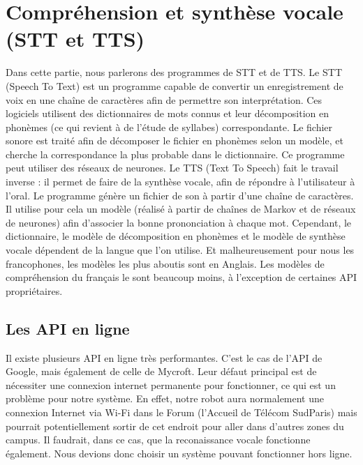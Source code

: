 \documentclass[a4paper,10pt]{report}
\begin{document}
    \section{Compréhension et synthèse vocale (STT et TTS)}
    {Dans cette partie, nous parlerons des programmes de STT et de TTS.}
    {Le STT (Speech To Text) est un programme capable de convertir un enregistrement de voix en une chaîne de caractères afin de permettre son interprétation. Ces logiciels utilisent des dictionnaires de mots connus et leur décomposition en phonèmes (ce qui revient à de l'étude de syllabes) correspondante. Le fichier sonore est traité afin de décomposer le fichier en phonèmes selon un modèle, et cherche la correspondance la plus probable dans le dictionnaire. Ce programme peut utiliser des réseaux de neurones.}
    {Le TTS (Text To Speech) fait le travail inverse : il permet de faire de la synthèse vocale, afin de répondre à l'utilisateur à l'oral. Le programme génère un fichier de son à partir d'une chaîne de caractères. Il utilise pour cela un modèle (réalisé à partir de chaînes de Markov et de réseaux de neurones) afin d'associer la bonne prononciation à chaque mot.}
    {\newline Cependant, le dictionnaire, le modèle de décomposition en phonèmes et le modèle de synthèse vocale dépendent de la langue que l'on utilise. Et malheureusement pour nous les francophones, les modèles les plus aboutis sont en Anglais. Les modèles de compréhension du français le sont beaucoup moins, à l'exception de certaines API propriétaires.}
      \subsection{Les API en ligne}
      {Il existe plusieurs API en ligne très performantes. C'est le cas de l'API de Google, mais également de celle de Mycroft. Leur défaut principal est de nécessiter une connexion internet permanente pour fonctionner, ce qui est un problème pour notre système. En effet, notre robot aura normalement une connexion Internet via Wi-Fi dans le Forum (l'Accueil de Télécom SudParis) mais pourrait potentiellement sortir de cet endroit pour aller dans d'autres zones du campus. Il faudrait, dans ce cas, que la reconaissance vocale fonctionne également. Nous devions donc choisir un système pouvant fonctionner hors ligne.}
\end{document}
